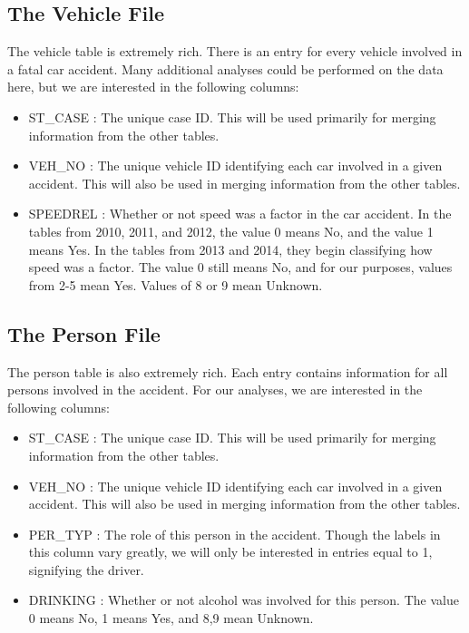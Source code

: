 \subsection*{The Vehicle File}
The vehicle table is extremely rich. There is an entry for every vehicle involved
in a fatal car accident. Many additional analyses could be performed
on the data here, but we are interested in the following columns:
\begin{itemize}
    \item ST\_CASE : The unique case ID. This will be used primarily for merging
        information from the other tables.
    \item VEH\_NO : The unique vehicle ID identifying each car involved in a given
        accident. This will also be used in merging information from the other
        tables.
    \item SPEEDREL : Whether or not speed was a factor in the car accident. In
        the tables from 2010, 2011, and 2012, the value 0 means No, and the
        value 1 means Yes. In the tables from 2013 and 2014, they begin classifying
        how speed was a factor. The value 0 still means No, and for our purposes,
        values from 2-5 mean Yes. Values of 8 or 9 mean Unknown.
\end{itemize}

\subsection*{The Person File}
The person table is also extremely rich. Each entry contains information for all
persons involved in the accident. For our analyses, we are interested in the
following columns:
\begin{itemize}
    \item ST\_CASE : The unique case ID. This will be used primarily for merging
        information from the other tables.
    \item VEH\_NO : The unique vehicle ID identifying each car involved in a given
        accident. This will also be used in merging information from the other
        tables.
    \item PER\_TYP : The role of this person in the accident. Though the labels in
        this column vary greatly, we will only be interested in entries equal to
        1, signifying the driver.
    \item DRINKING : Whether or not alcohol was involved for this person. The value
        0 means No, 1 means Yes, and 8,9 mean Unknown.
\end{itemize}

